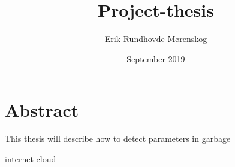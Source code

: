 \documentclass{article}
\title{Project-thesis}
\author{Erik Rundhovde M\o renskog}
\date{September 2019}
\begin{document}
\maketitle

\section{Abstract}
This thesis will describe how to detect parameters in garbage 

internet cloud
\end{document}
